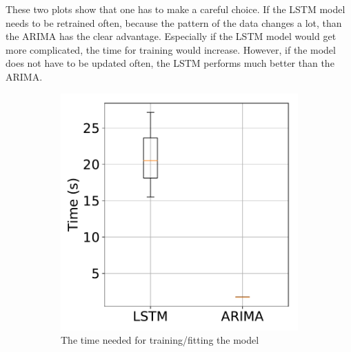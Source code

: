 These two plots show that one has to make a careful choice.
If the LSTM model needs to be retrained often, because the pattern of the data changes a lot, than the ARIMA has the clear advantage.
Especially if the LSTM model would get more complicated, the time for training would increase.
However, if the model does not have to be updated often, the LSTM performs much better than the ARIMA.

\begin{figure}
	\centering
	\begin{subfigure}{0.4\linewidth}
		\centering
		\includegraphics[width=1\linewidth]{Pictures/TimeComp/TrainingTime}
		\caption{The time needed for training/fitting the model}
		\label{fig:BoxTraining}
	\end{subfigure}
	\begin{subfigure}{0.4\linewidth}
		\centering

\end{subfigure}
\end{figure}
